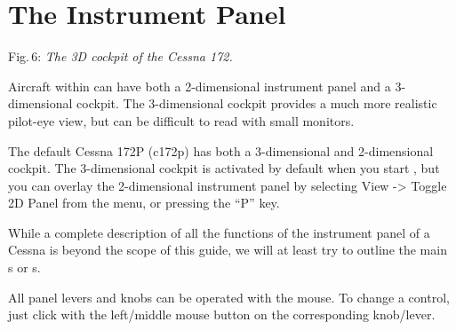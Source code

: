\section{The Instrument Panel}

 \centerline{}

\smallskip
 \noindent
Fig.\,6: \textit{The 3D cockpit of the Cessna 172.}
\medskip

Aircraft within \FlightGear{} can have both a 2-dimensional instrument panel
and a 3-dimensional cockpit. The 3-dimensional cockpit provides a much
more realistic pilot-eye view, but can be difficult to read with small
monitors.

The default Cessna 172P (c172p) has both a 3-dimensional and 2-dimensional
cockpit. The 3-dimensional cockpit is activated by default when you start
\FlightGear{}, but you can overlay the 2-dimensional instrument panel by
selecting View -> Toggle 2D Panel from the menu, or pressing the ``P'' key.

While a complete description of all the functions of the instrument panel
of a Cessna is beyond the scope of this guide, we will at least try to outline
the main s or s.

All panel levers and knobs can be operated with the mouse. To change a
control, just click with the left/middle mouse button on the
corresponding knob/lever.

